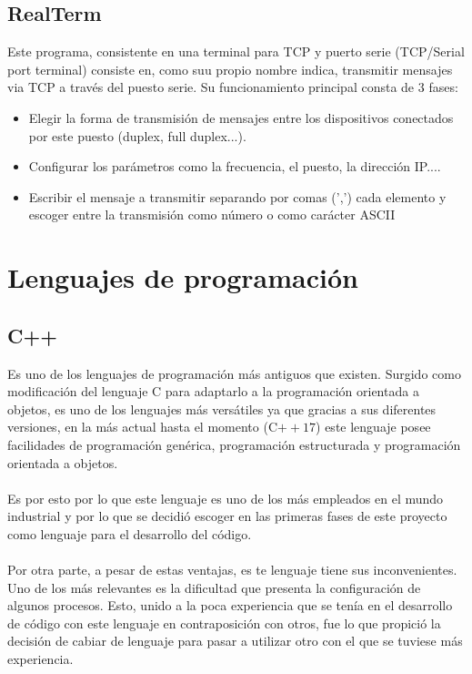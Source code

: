 \subsection{RealTerm}

Este programa, consistente en una terminal para TCP y puerto serie (TCP/Serial port terminal) consiste en, como suu propio nombre indica, transmitir mensajes via TCP a través del puesto serie. Su funcionamiento principal consta de 3 fases:
\begin{itemize}
	\item Elegir la forma de transmisión de mensajes entre los dispositivos conectados por este puesto (duplex, full duplex...).
	\item Configurar los parámetros como la frecuencia, el puesto, la dirección IP....
	\item Escribir el mensaje a transmitir separando por comas (',') cada elemento y escoger entre la transmisión como número o como carácter ASCII
\end{itemize}

\section{Lenguajes de programación}

\subsection{C++}
Es uno de los lenguajes de programación más antiguos que existen. Surgido como modificación del lenguaje C para adaptarlo a la programación orientada a objetos, es uno de los lenguajes más versátiles ya que gracias a sus diferentes versiones, en la más actual hasta el momento (C$++17$) este lenguaje posee facilidades de programación genérica,  programación estructurada y programación orientada a objetos.\\
\\
Es por esto por lo que este lenguaje es uno de los más empleados en el mundo industrial y por lo que se decidió escoger en las primeras fases de este proyecto como lenguaje para el desarrollo del código.\\
\\
Por otra parte, a pesar de estas ventajas, es te lenguaje tiene sus inconvenientes. Uno de los más relevantes es la dificultad que presenta la configuración de algunos procesos. Esto, unido a la poca experiencia que se tenía en el desarrollo de código con este lenguaje en contraposición con otros, fue lo que propició la decisión de cabiar de lenguaje para pasar a utilizar otro con el que se tuviese más experiencia.


